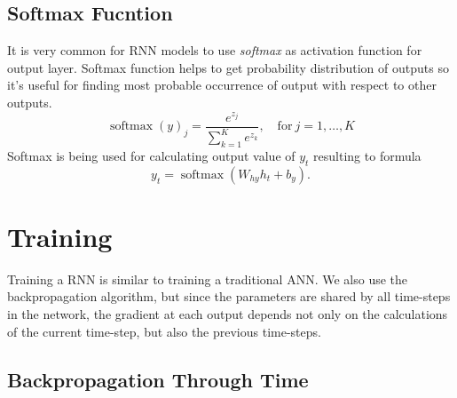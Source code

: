 \subsection{Softmax Fucntion}
It is very common for RNN models to use \textit{softmax} as activation function for output layer.
Softmax function helps to get probability distribution of outputs so it's useful for finding most probable occurrence of output with respect to other outputs.
\[ \operatorname{softmax}(y)_j = \frac{e^{z_j}}{\sum_{k=1}^K e^{z_k}}, \quad \text{for} \ j = 1, \ldots,  K \]
Softmax is being used for calculating output value of $y_t$ resulting to formula
\[ y_t = \operatorname{softmax}(W_{hy}h_t + b_y). \]


\section{Training}

Training a RNN is similar to training a traditional ANN.
We also use the backpropagation algorithm, but since the parameters are shared by all time-steps in the network, the gradient at each output depends not only on the calculations of the current time-step, but also the previous time-steps\cite{rnn_train}.


\subsection{Backpropagation Through Time}

